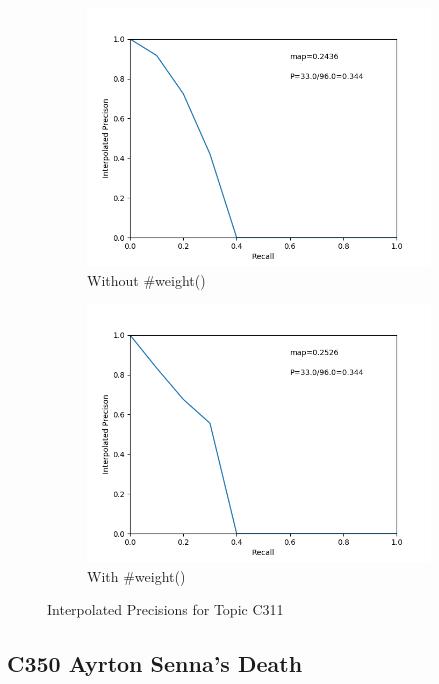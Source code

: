 \documentclass[11pt]{article} %
\begin{document}
\begin{figure}[p]
    \centering
    \begin{subfigure}{0.45\textwidth}
      \includegraphics[width=0.9\linewidth]{342/figure_1.png}
      \caption{Without \#weight()}
    \end{subfigure}
    \begin{subfigure}{0.45\textwidth}
        \includegraphics[width=0.9\linewidth]{342/figure_2.png}
        \caption{With \#weight()}
    \end{subfigure}
    \caption{Interpolated Precisions for Topic C311}
\end{figure}

\subsection{C350 Ayrton Senna's Death}
\end{document}
